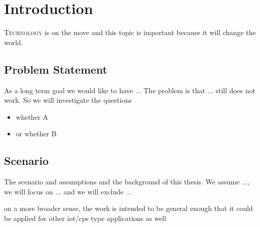 \documentclass[%
    ]{\PathToTumTemplate/thesis/tum_thesis}
\begin{document}
\cleardoublepage
\mainmatter


\chapter{Introduction}
 
 
\lettrine{T}{echnology} is on the move and this topic is important because it will change the world.



\section{Problem Statement}\label{sec:probstat}
As a long term goal we would like to have ...
The problem is that ... still does not work. So we will investigate the questions
\begin{itemize}
    \item whether A
    \item or whether B
\end{itemize}



\section{Scenario}

The scenario and assumptions and the background of this thesis. We assume ..., we will focus on ... and we will exclude ...

on a more broader sense, the work is intended to be general enough that it could be applied for other iot/cps type applications as well
\end{document}
